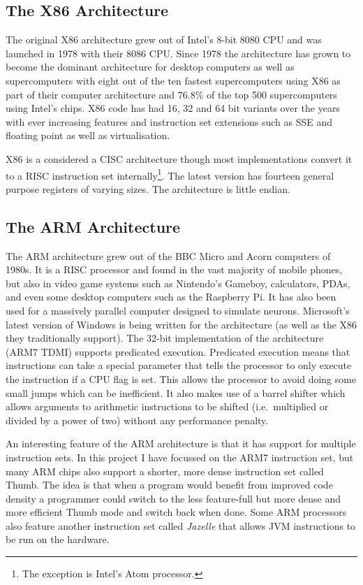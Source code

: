 \documentclass[10pt,]{book}
\begin{document}
\subsection{The X86 Architecture}

The original X86 architecture grew out of Intel's 8-bit 8080 CPU and was
launched in 1978 with their 8086 CPU. Since 1978 the architecture has
grown to become the dominant architecture for desktop computers as well
as supercomputers with eight out of the ten fastest supercomputers using
X86 as part of their computer architecture and 76.8\% of the top 500
supercomputers using Intel's chips\autocite{top500}. X86 code has had
16, 32 and 64 bit variants over the years with ever increasing features
and instruction set extensions such as SSE and floating point as well as
virtualisation\autocite{IntelCorporation:2011wn}.

X86 is a considered a CISC architecture though most implementations
convert it to a RISC instruction set internally\footnote{The exception
  is Intel's Atom processor\autocite{Shimpi:2008ul}.}. The latest
version has fourteen general purpose registers of varying sizes. The
architecture is little endian.

\subsection{The ARM Architecture}

The ARM architecture grew out of the BBC Micro and Acorn computers of
1980s. It is a RISC processor and found in the vast majority of mobile
phones\autocite{Krazit:ue}, but also in video game systems such as
Nintendo's Gameboy, calculators, PDAs, and even some desktop computers
such as the Raspberry Pi. It has also been used for a massively parallel
computer designed to simulate neurons\autocite{Khan:2008uv}. Microsoft's
latest version of Windows is being written for the architecture (as well
as the X86 they traditionally support). The 32-bit implementation of the
architecture (ARM7 TDMI) supports predicated execution. Predicated
execution means that instructions can take a special parameter that
tells the processor to only execute the instruction if a CPU flag is
set. This allows the processor to avoid doing some small jumps which can
be inefficient. It also makes use of a barrel shifter which allows
arguments to arithmetic instructions to be shifted (i.e.~multiplied or
divided by a power of two) without any performance penalty.

An interesting feature of the ARM architecture is that it has support
for multiple instruction sets. In this project I have focussed on the
ARM7 instruction set, but many ARM chips also support a shorter, more
dense instruction set called Thumb. The idea is that when a program
would benefit from improved code density a programmer could switch to
the less feature-full but more dense and more efficient Thumb mode and
switch back when done. Some ARM processors also feature another
instruction set called \emph{Jazelle} that allows JVM instructions to be
run on the hardware.
\end{document}
